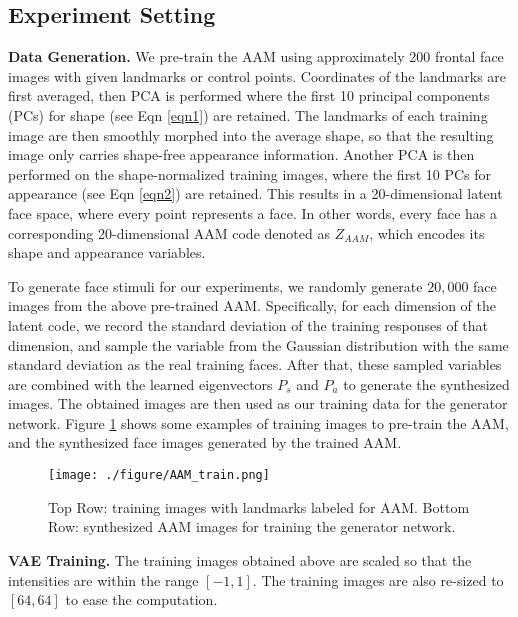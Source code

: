 \documentclass{article}
\begin{document}
\subsection{Experiment Setting}
\noindent \textbf{Data Generation.} We pre-train the AAM using approximately 200 frontal face images with given landmarks or control points. Coordinates of the landmarks are first averaged, then PCA is performed where the first 10 principal components (PCs) for shape (see Eqn \ref{eqn1}) are retained. The landmarks of each training image are then smoothly morphed into the average shape, so that the resulting image only carries shape-free appearance information. Another PCA is then performed on the shape-normalized training images, where the first 10 PCs for appearance (see Eqn \ref{eqn2}) are retained. This results in a 20-dimensional latent face space, where every point represents a face. In other words, every face has a corresponding 20-dimensional AAM code denoted as $Z_{AAM}$, which encodes its shape and appearance variables.

To generate face stimuli for our experiments, we randomly generate $20,000$ face images from the above pre-trained AAM. Specifically, for each dimension of the latent code, we record the standard deviation of the training responses of that dimension, and sample the variable from the Gaussian distribution with the same standard deviation as the real training faces. After that, these sampled variables are combined with the learned eigenvectors $P_s$ and $P_a$ to generate the synthesized images. The obtained images are then used as our training data for the generator network. Figure \ref{fig:AAM_train} shows some examples of training images to pre-train the AAM, and the synthesized face images generated by the trained AAM.

\begin{figure}[h]
	\begin{center}
		\texttt{[image: ./figure/AAM\_train.png]}\hspace{0.5mm}
		\caption{Top Row: training images with landmarks labeled for AAM. Bottom Row: synthesized AAM images for training the generator network.}
		\label{fig:AAM_train}
	\end{center}

\end{figure}

\noindent \textbf{VAE Training.} The training images obtained above are scaled so that the intensities are within the range $[-1,1]$. The training images are also re-sized to $[64, 64]$ to ease the computation.
\end{document}
